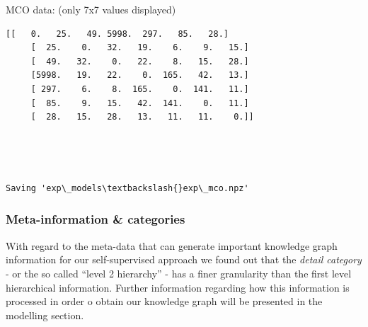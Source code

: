 \documentclass[11pt]{article}
\begin{document}
    MCO data: (only 7x7 values displayed)

    

\begin{Verbatim}[commandchars=\\\{\},fontsize=\footnotesize]
    [[   0.   25.   49. 5998.  297.   85.   28.]
     [  25.    0.   32.   19.    6.    9.   15.]
     [  49.   32.    0.   22.    8.   15.   28.]
     [5998.   19.   22.    0.  165.   42.   13.]
     [ 297.    6.    8.  165.    0.  141.   11.]
     [  85.    9.   15.   42.  141.    0.   11.]
     [  28.   15.   28.   13.   11.   11.    0.]]

\end{Verbatim}


    \begin{center}
    \end{center}
    { \hspace*{\fill} \\}
    


    \begin{center}
    \end{center}
    { \hspace*{\fill} \\}
    

\begin{Verbatim}[commandchars=\\\{\},fontsize=\footnotesize]
Saving 'exp\_models\textbackslash{}exp\_mco.npz'

\end{Verbatim}

    \hypertarget{meta-information-categories}{%
\subsubsection{Meta-information \&
categories}\label{meta-information-categories}}

With regard to the meta-data that can generate important knowledge graph
information for our self-supervised approach we found out that the
\emph{detail category} - or the so called ``level 2 hierarchy'' - has a
finer granularity than the first level hierarchical information. Further
information regarding how this information is processed in order o
obtain our knowledge graph will be presented in the modelling section.
\end{document}
